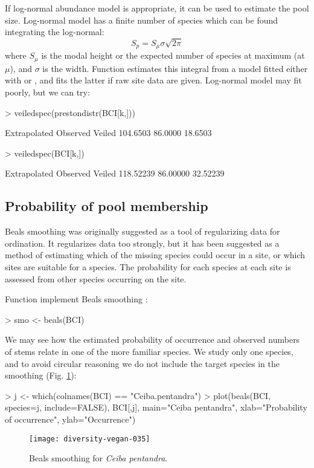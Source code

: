 \documentclass[a4paper,10pt,twocolumn]{article}
\begin{document}
If log-normal abundance model is appropriate, it can be used to
estimate the pool size.  Log-normal model has a finite number of
species which can be found integrating the log-normal:
\begin{equation}
S_p = S_\mu \sigma \sqrt{2 \pi}
\end{equation}
where $S_\mu$ is the modal height or the expected number of species at
maximum (at $\mu$), and $\sigma$ is the width.  Function
 estimates this integral from a model fitted either
with  or , and fits the latter
if raw site data are given.  Log-normal model may fit poorly, but we
can try:
\begin{Schunk}
\begin{Sinput}
> veiledspec(prestondistr(BCI[k,]))
\end{Sinput}
\begin{Soutput}
Extrapolated     Observed       Veiled 
    104.6503      86.0000      18.6503 
\end{Soutput}
\begin{Sinput}
> veiledspec(BCI[k,])
\end{Sinput}
\begin{Soutput}
Extrapolated     Observed       Veiled 
   118.52239     86.00000     32.52239 
\end{Soutput}
\end{Schunk}

\subsection{Probability of pool membership}

Beals smoothing was originally suggested as a tool of regularizing data
for ordination.  It regularizes data too strongly,
but it has been suggested as a method of estimating which of the
missing species could occur in a site, or which sites are suitable for
a species.  The probability for each species at each site is assessed
from other species occurring on the site.

Function  implement Beals smoothing \citep{McCune87,
  DeCaceresLegendre08}:
\begin{Schunk}
\begin{Sinput}
> smo <- beals(BCI)
\end{Sinput}
\end{Schunk}
We may see how the estimated probability of occurrence and observed
numbers of stems relate in one of the more familiar species. We study
only one species, and to avoid circular reasoning we do not include
the target species in the smoothing (Fig. \ref{fig:beals}):
\begin{Schunk}
\begin{Sinput}
> j <- which(colnames(BCI) == "Ceiba.pentandra")
> plot(beals(BCI, species=j, include=FALSE), BCI[,j], 
       main="Ceiba pentandra", xlab="Probability of occurrence",
       ylab="Occurrence")
\end{Sinput}
\end{Schunk}
\begin{figure}
\texttt{[image: diversity-vegan-035]}
\caption{Beals smoothing for \emph{Ceiba pentandra}.}
\label{fig:beals}
\end{figure}


\end{document}
